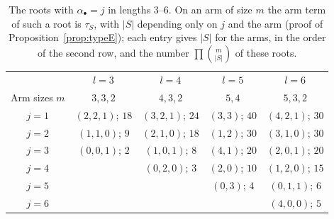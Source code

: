 \documentclass[11pt]{amsart}
\numberwithin{table}{section}
\numberwithin{figure}{section}
\numberwithin{equation}{section}
\theoremstyle{definition}
\theoremstyle{plain}
\newcommand{\bul}{\bullet}
\begin{document}
\begin{table}[ht]
\caption{The roots with $\alpha_\bul = j$ in lengths $3$--$6$. On an arm of size $m$ the arm term of such a root is $\tau_S$, with $|S|$ depending only on $j$ and the arm (proof of Proposition~\ref{prop:typeE}); each entry gives $|S|$ for the arms, in the order of the second row, and the number $\prod \binom{m}{|S|}$ of these roots.}\label{tab:levi}
\begin{tabular}{@{}ccccc@{}}
\toprule
 & $l = 3$ & $l = 4$ & $l = 5$ & $l = 6$ \\
Arm sizes $m$ & $3, 3, 2$ & $4, 3, 2$ & $5, 4$ & $5, 3, 2$ \\
\midrule
$j = 1$ & $(2, 2, 1)$; $18$ & $(3, 2, 1)$; $24$ & $(3, 3)$; $40$ & $(4, 2, 1)$; $30$ \\
$j = 2$ & $(1, 1, 0)$; $9$ & $(2, 1, 0)$; $18$ & $(1, 2)$; $30$ & $(3, 1, 0)$; $30$ \\
$j = 3$ & $(0, 0, 1)$; $2$ & $(1, 0, 1)$; $8$ & $(4, 1)$; $20$ & $(2, 0, 1)$; $20$ \\
$j = 4$ & & $(0, 2, 0)$; $3$ & $(2, 0)$; $10$ & $(1, 2, 0)$; $15$ \\
$j = 5$ & & & $(0, 3)$; $4$ & $(0, 1, 1)$; $6$ \\
$j = 6$ & & & & $(4, 0, 0)$; $5$ \\
\bottomrule
\end{tabular}
\end{table}
\end{document}
